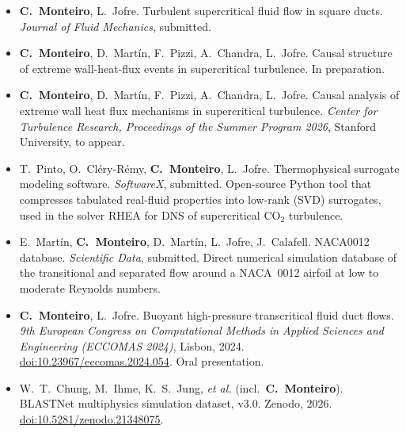 \documentclass[11pt]{article}
\begin{document}
\begin{itemize}[leftmargin=2.6em, labelwidth=2.2em, labelsep=0.4em, itemsep=1pt]
  \item[{[R1]}] \textbf{C.\ Monteiro}, L.\ Jofre. Turbulent supercritical fluid flow in square ducts. \emph{Journal of Fluid Mechanics}, submitted.
  \item[{[R2]}] \textbf{C.\ Monteiro}, D.\ Mart\'in, F.\ Pizzi, A.\ Chandra, L.\ Jofre. Causal structure of extreme wall-heat-flux events in supercritical turbulence. In preparation.
  \item[{[R3]}] \textbf{C.\ Monteiro}, D.\ Mart\'in, F.\ Pizzi, A.\ Chandra, L.\ Jofre. Causal analysis of extreme wall heat flux mechanisms in supercritical turbulence. \emph{Center for Turbulence Research, Proceedings of the Summer Program 2026}, Stanford University, to appear.
  \item[{[R4]}] T.\ Pinto, O.\ Cl\'ery-R\'emy, \textbf{C.\ Monteiro}, L.\ Jofre. Thermophysical surrogate modeling software. \emph{SoftwareX}, submitted. Open-source Python tool that compresses tabulated real-fluid properties into low-rank (SVD) surrogates, used in the solver RHEA for DNS of supercritical CO$_2$ turbulence.
  \item[{[R5]}] E.\ Mart\'in, \textbf{C.\ Monteiro}, D.\ Mart\'in, L.\ Jofre, J.\ Calafell. NACA0012 database. \emph{Scientific Data}, submitted. Direct numerical simulation database of the transitional and separated flow around a NACA~0012 airfoil at low to moderate Reynolds numbers.
  \item[{[C1]}] \textbf{C.\ Monteiro}, L.\ Jofre. Buoyant high-pressure transcritical fluid duct flows. \emph{9th European Congress on Computational Methods in Applied Sciences and Engineering (ECCOMAS 2024)}, Lisbon, 2024. \href{https://doi.org/10.23967/eccomas.2024.054}{doi:10.23967/eccomas.2024.054}. Oral presentation.
  \item[{[D1]}] W.\ T.\ Chung, M.\ Ihme, K.\ S.\ Jung, \emph{et al.} (incl.\ \textbf{C.\ Monteiro}). BLASTNet multiphysics simulation dataset, v3.0. Zenodo, 2026. \href{https://doi.org/10.5281/zenodo.21348075}{doi:10.5281/zenodo.21348075}.
\end{itemize}
\end{document}
